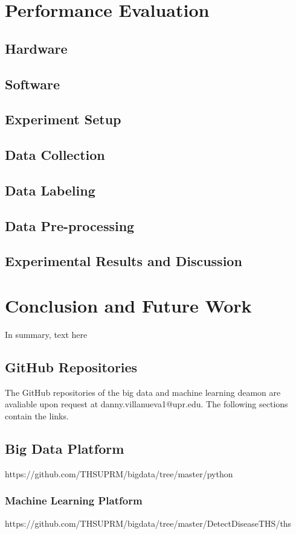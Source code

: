 \documentclass[12pt]{report}
\begin{document}
\chapter{Performance Evaluation} \label{chapter 5}
\section{Hardware} 
\section{Software}
\section{Experiment Setup}
\section{Data Collection}
\section{Data Labeling}
\section{Data Pre-processing}
\section{Experimental Results and Discussion}

\chapter{Conclusion and Future Work} \label{chapter 6}
In summary, text here


 

\begin{appendices}
\chapter{GitHub Repositories}
The GitHub repositories of the big data and machine learning deamon are avaliable upon request at danny.villanueva1@upr.edu. The following sections contain the links.

\section{Big Data Platform}
https://github.com/THSUPRM/bigdata/tree/master/python

\subsection{Machine Learning Platform}
https://github.com/THSUPRM/bigdata/tree/master/DetectDiseaseTHS/ths
\end{appendices}
\end{document}
